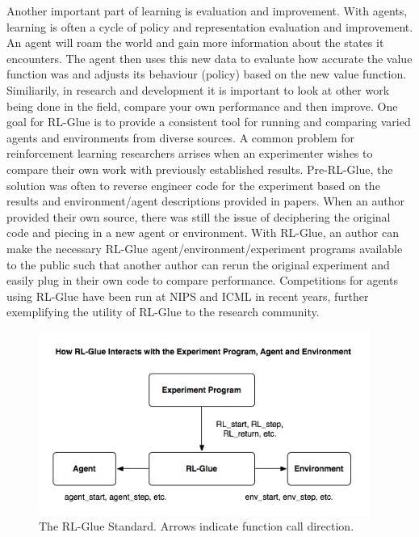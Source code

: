 \documentclass[11pt]{article}
\begin{document}
Another important part of learning is evaluation and improvement. With agents, learning is often a cycle of policy and representation evaluation and improvement.  An agent will roam the world and gain more information about the states it encounters. The agent then uses this new data to evaluate how accurate the value function was and adjusts its behaviour (policy) based on the new value function. Similiarily, in research and development it is important to look at other work being done in the field, compare your own performance and then improve. One goal for RL-Glue is to provide a consistent tool for running and comparing varied agents and environments from diverse sources. A common problem for reinforcement learning researchers arrises when an experimenter wishes to compare their own work with previously established results. Pre-RL-Glue, the solution was often to reverse engineer code for the experiment based on the results and environment/agent descriptions provided in papers.  When an author provided their own source, there was still the issue of deciphering the original code and piecing in a new agent or environment. With RL-Glue, an author can make the necessary RL-Glue agent/environment/experiment programs  available to the public such that another author can rerun the original experiment and easily plug in their own code to compare performance.  Competitions for agents using RL-Glue have been run at NIPS and ICML in recent years, further exemplifying the utility of RL-Glue to the research community.
 
\begin{figure}
\label{fig1}
\begin{center}
\includegraphics[height=60mm]{images/glue_connections_no_shadow.png}
\caption{\small The RL-Glue Standard. Arrows indicate function call direction.}
\end{center}
\end{figure}
\end{document}
